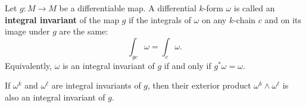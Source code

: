 Let $g: M \to M$ be a differentiable map. A differential $k$-form $\omega$ is called an \textbf{integral invariant} of the map $g$ if the integrals of $\omega$ on any $k$-chain $c$ and on its image under $g$ are the same:
$$
\int_{gc} \omega = \int_c \omega.
$$
Equivalently, $\omega$ is an integral invariant of $g$ if and only if $g^*\omega = \omega$.

If $\omega^k$ and $\omega^\ell$ are integral invariants of $g$, then their exterior product $\omega^k \wedge \omega^\ell$ is also an integral invariant of $g$.
